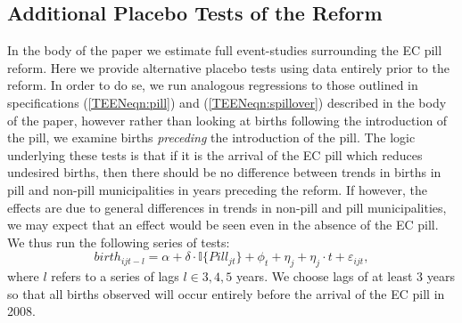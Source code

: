 \documentclass[11pt,subeqn]{article}
\begin{document}
\begin{spacing}{1.4}
\clearpage

%
%






\clearpage
\section{Additional Placebo Tests of the Reform}
\label{TEENsscn:placebo}
In the body of the paper we estimate full event-studies surrounding the EC pill
reform. Here we provide alternative placebo tests using data entirely prior to
the reform. In order to do se, we run analogous regressions to those outlined in
specifications (\ref{TEENeqn:pill}) and (\ref{TEENeqn:spillover}) described in 
the body of the paper, however rather than looking at births following the 
introduction of the pill, we examine births \emph{preceding} the introduction of 
the pill.  The logic underlying these tests is that if it is the arrival of the 
EC pill which reduces undesired births, then there should be no difference 
between trends in births in pill and non-pill municipalities in years preceding 
the reform.  If however, the effects are due to general differences in trends in 
non-pill and pill municipalities, we may expect that an effect would be seen even 
in the absence of the EC pill.  We thus run the following series of tests:
\begin{equation}\tag{A1}
 \label{TEENeqn:placebo}
birth_{ijt-l} = \alpha + \delta\cdot \mathbb{I}\{Pill_{jt}\} + \phi_t + \eta_j + 
\eta_j\cdot t + \varepsilon_{ijt},
\end{equation}
where $l$ refers to a series of lags $l\in 3,4,5$ years.  We choose lags of
at least 3 years so that all births observed will occur entirely before the 
arrival of the EC pill in 2008.


\end{spacing}
\end{document}
